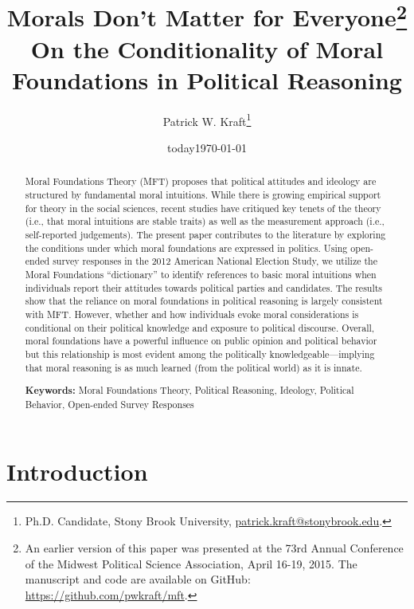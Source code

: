 \documentclass[12pt]{article}
\author{Patrick W. Kraft\footnote{Ph.D. Candidate, Stony Brook University, \href{mailto:patrick.kraft@stonybrook.edu}{patrick.kraft@stonybrook.edu}.
}}
\date{today}
\title{Morals Don't Matter for Everyone\footnote{An earlier version of this paper was presented at the 73rd Annual Conference of the Midwest Political Science Association, April 16-19, 2015. The manuscript and code are available on GitHub: \url{https://github.com/pwkraft/mft}.}\\
\large{On the Conditionality of Moral Foundations in Political Reasoning}}
\date{\today}
\begin{document}
\maketitle
\onehalfspacing

\begin{abstract}
Moral Foundations Theory (MFT) proposes that political attitudes and ideology are structured by fundamental moral intuitions. While there is growing empirical support for theory in the social sciences, recent studies have critiqued key tenets of the theory (i.e., that moral intuitions are stable traits) as well as the measurement approach (i.e., self-reported judgements). The present paper contributes to the literature by exploring the conditions under which moral foundations are expressed in politics. Using open-ended survey responses in the 2012 American National Election Study, we utilize the Moral Foundations ``dictionary'' to identify references to basic moral intuitions when individuals report their attitudes towards political parties and candidates. The results show that the reliance on moral foundations in political reasoning is largely consistent with MFT. However, whether and how individuals evoke moral considerations is conditional on their political knowledge and exposure to political discourse. Overall, moral foundations have a powerful influence on public opinion and political behavior but this relationship is most evident among the politically knowledgeable---implying that moral reasoning is as much learned (from the political world) as it is innate. 

\vspace{\baselineskip}
\noindent \textbf{Keywords:} Moral Foundations Theory, Political Reasoning, Ideology, Political Behavior, Open-ended Survey Responses
\end{abstract}
\newpage


\section{Introduction}

\end{document}
